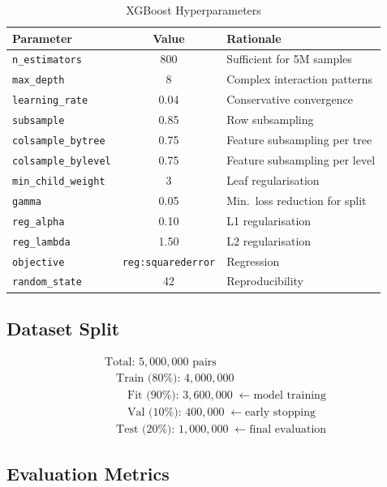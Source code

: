\documentclass[10pt,journal,compsoc]{IEEEtran}
\begin{document}
\begin{table}[!t]
\caption{XGBoost Hyperparameters}
\label{tab:xgb_params}
\centering
\begin{tabular}{lcp{3.8cm}}
\toprule
\textbf{Parameter} & \textbf{Value} & \textbf{Rationale} \\
\midrule
\texttt{n\_estimators}      & 800  & Sufficient for 5M samples \\
\texttt{max\_depth}         & 8    & Complex interaction patterns \\
\texttt{learning\_rate}     & 0.04 & Conservative convergence \\
\texttt{subsample}          & 0.85 & Row subsampling \\
\texttt{colsample\_bytree}  & 0.75 & Feature subsampling per tree \\
\texttt{colsample\_bylevel} & 0.75 & Feature subsampling per level \\
\texttt{min\_child\_weight} & 3    & Leaf regularisation \\
\texttt{gamma}              & 0.05 & Min.\ loss reduction for split \\
\texttt{reg\_alpha}         & 0.10 & L1 regularisation \\
\texttt{reg\_lambda}        & 1.50 & L2 regularisation \\
\texttt{objective}          & \texttt{reg:squarederror} & Regression \\
\texttt{random\_state}      & 42   & Reproducibility \\
\bottomrule
\end{tabular}
\end{table}

\subsection{Dataset Split}

\begin{align*}
  &\text{Total: }5{,}000{,}000\text{ pairs}\\
  &\quad\text{Train (80\%): }4{,}000{,}000\\
  &\quad\quad\text{Fit (90\%): }3{,}600{,}000\;\leftarrow\text{model training}\\
  &\quad\quad\text{Val (10\%): }400{,}000\;\leftarrow\text{early stopping}\\
  &\quad\text{Test (20\%): }1{,}000{,}000\;\leftarrow\text{final evaluation}
\end{align*}

\subsection{Evaluation Metrics}
\end{document}
